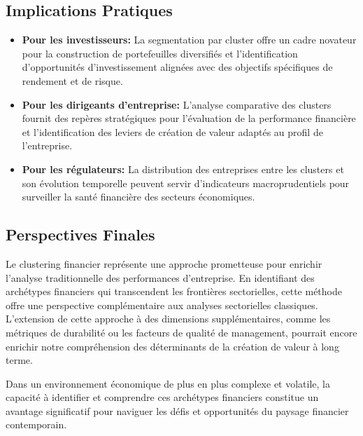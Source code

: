 \subsection{Implications Pratiques}
\begin{itemize}
    \item \textbf{Pour les investisseurs:} La segmentation par cluster offre un cadre novateur pour la construction de portefeuilles diversifiés et l'identification d'opportunités d'investissement alignées avec des objectifs spécifiques de rendement et de risque.
    
    \item \textbf{Pour les dirigeants d'entreprise:} L'analyse comparative des clusters fournit des repères stratégiques pour l'évaluation de la performance financière et l'identification des leviers de création de valeur adaptés au profil de l'entreprise.
    
    \item \textbf{Pour les régulateurs:} La distribution des entreprises entre les clusters et son évolution temporelle peuvent servir d'indicateurs macroprudentiels pour surveiller la santé financière des secteurs économiques.
\end{itemize}

\subsection{Perspectives Finales}
Le clustering financier représente une approche prometteuse pour enrichir l'analyse traditionnelle des performances d'entreprise. En identifiant des archétypes financiers qui transcendent les frontières sectorielles, cette méthode offre une perspective complémentaire aux analyses sectorielles classiques. L'extension de cette approche à des dimensions supplémentaires, comme les métriques de durabilité ou les facteurs de qualité de management, pourrait encore enrichir notre compréhension des déterminants de la création de valeur à long terme.

Dans un environnement économique de plus en plus complexe et volatile, la capacité à identifier et comprendre ces archétypes financiers constitue un avantage significatif pour naviguer les défis et opportunités du paysage financier contemporain.

